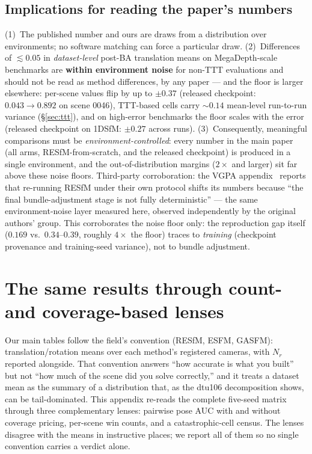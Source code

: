 \documentclass{article}
\begin{document}
\subsection{Implications for reading the paper's numbers}\label{sec:implications}
(1)~The published number and ours are draws from a distribution over environments; no
software matching can force a particular draw. (2)~Differences of $\lesssim\!0.05$ in
\emph{dataset-level} post-BA translation means on MegaDepth-scale benchmarks are
\textbf{within environment noise} for non-TTT evaluations and should not be read as
method differences, by any paper --- and the floor is larger elsewhere: per-scene
values flip by up to $\pm0.37$ (released checkpoint: $0.043\!\to\!0.892$ on scene 0046),
TTT-based cells carry $\sim\!0.14$ mean-level run-to-run variance
(\S\ref{sec:ttt}), and on high-error benchmarks the floor scales with the error
(released checkpoint on 1DSfM: $\pm0.27$ across runs). (3)~Consequently, meaningful
comparisons must be \emph{environment-controlled}: every number in the main paper
(all arms, RESfM-from-scratch, and the released checkpoint) is produced in a single
environment, and the out-of-distribution margins ($2\times$ and larger) sit far above
these noise floors. Third-party corroboration: the VGPA appendix~\citep{vgpa} reports
that re-running RESfM under their own protocol shifts its numbers because ``the final
bundle-adjustment stage is not fully deterministic'' --- the same environment-noise
layer measured here, observed independently by the original authors' group. This
corroborates the noise floor only: the reproduction gap itself ($0.169$ vs.\
$0.34$--$0.39$, roughly $4\times$ the floor) traces to \emph{training} (checkpoint
provenance and training-seed variance), not to bundle adjustment.


\section{The same results through count- and coverage-based lenses}\label{app:lenses}
Our main tables follow the field's convention (RESfM, ESFM, GASFM): translation/rotation
means over each method's registered cameras, with $N_r$ reported alongside. That
convention answers ``how accurate is what you built'' but not ``how much of the scene
did you solve correctly,'' and it treats a dataset mean as the summary of a
distribution that, as the dtu106 decomposition shows, can be tail-dominated. This
appendix re-reads the complete five-seed matrix through three complementary lenses:
pairwise pose AUC with and without coverage pricing, per-scene win counts, and a
catastrophic-cell census. The lenses disagree with the means in instructive places;
we report all of them so no single convention carries a verdict alone.
\end{document}
